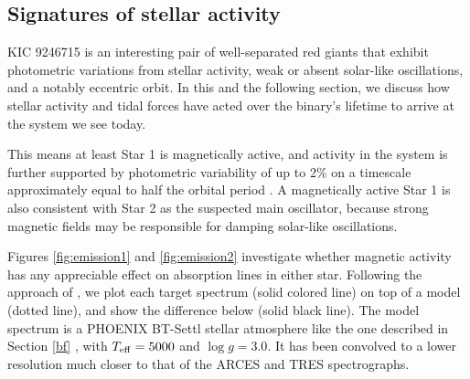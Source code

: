 \subsection{Signatures of stellar activity}\label{actrot}
KIC 9246715 is an interesting pair of well-separated red giants that exhibit photometric variations from stellar activity, weak or absent solar-like oscillations, and a notably eccentric orbit. In this and the following section, we discuss how stellar activity and tidal forces have acted over the binary's lifetime to arrive at the system we see today. 

 This means at least Star 1 is magnetically active, and activity in the system is further supported by photometric variability of up to 2\% on a timescale approximately equal to half the orbital period \citep{gau14}. A magnetically active Star 1 is also consistent with Star 2 as the suspected main oscillator, because strong magnetic fields may be responsible for damping solar-like oscillations.

Figures \ref{fig:emission1} and \ref{fig:emission2} investigate whether magnetic activity has any appreciable effect on absorption lines in either star. Following the approach of \citet{fro12}, we plot each target spectrum (solid colored line) on top of a model (dotted line), and show the difference below (solid black line). The model spectrum is a PHOENIX BT-Settl stellar atmosphere like the one described in Section \ref{bf} \citep{all03,asp09}, with $T_{\rm{eff}} = 5000$ and $\log g = 3.0$. It has been convolved to a lower resolution much closer to that of the ARCES and TRES spectrographs.

